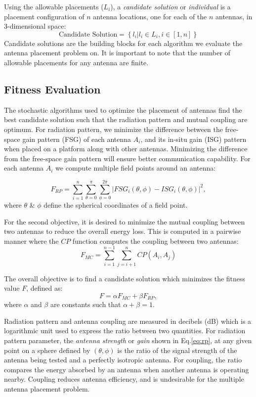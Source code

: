 \documentclass[conference]{IEEEtran}
\begin{document}
Using the allowable placements ($L_i$), a \textit{candidate solution} or \textit{individual} is a placement configuration of $n$ antenna locations, one for each of the $n$ antennas, in 3-dimensional space:
\[
    \text{Candidate Solution}  = \left\{l_i | l_i \in L_i, i \in [1,n]\right\}
\]
Candidate solutions are the building blocks for each algorithm we evaluate the antenna placement problem on. It is important to note that the number of allowable placements for any antenna are finite. 

\subsection{Fitness Evaluation}
The stochastic algorithms used to optimize the placement of antennas find the best candidate solution such that the radiation pattern and mutual coupling are optimum. For radiation pattern, we minimize the difference between the free-space gain pattern (FSG) of each antenna $A_i$, and its in-situ gain (ISG) pattern when placed on a platform along with other antennas. Minimizing the difference from the free-space gain pattern will ensure better communication capability. For each antenna $A_i$ we compute multiple field points around an antenna:

\begin{equation} \label{eq:rp}
    F_{RP} = \sum_{i=1}^n\sum_{\theta=0}^\pi\sum_{\phi=0}^{2\pi}
           \left| FSG_i(\theta,\phi) - ISG_i(\theta,\phi) \right| ^2,
\end{equation}
where $\theta$ \& $\phi$ define the spherical coordinates of a field point.

For the second objective, it is desired to minimize the mutual coupling between two antennas to reduce the overall energy loss. This is computed in a pairwise manner where the $CP$ function computes the coupling between two antennas:
\begin{equation}
  F_{MC} = \sum_{i=1}^{n-1}\sum_{j=i+1}^{n} CP(A_i, A_j)
\end{equation}

The overall objective is to find a candidate solution which minimizes the fitness value $F$, defined as:
\begin{equation} \label{eq:optimal}
  F = \alpha F_{MC} + \beta F_{RP},
\end{equation}
where $\alpha$ and $\beta$ are constants such that $\alpha + \beta = 1$. 

Radiation pattern and antenna coupling are measured in decibels (dB) which is a logarithmic unit used to express the ratio between two quantities. For radiation pattern parameter, the \textit{antenna strength} or \textit{gain} shown in Eq.\eqref{eq:rp}, at any given point on a sphere defined by $(\theta, \phi)$ is the ratio of the signal strength of the antenna being tested and a perfectly isotropic antenna. For coupling, the ratio compares the energy absorbed by an antenna when another antenna is operating nearby. Coupling reduces antenna efficiency, and is undesirable for the multiple antenna placement problem.
\end{document}
